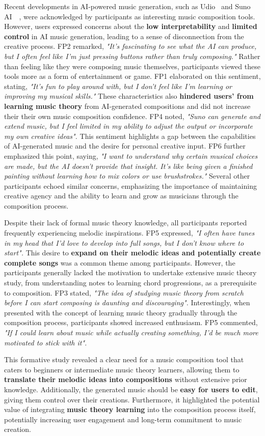 Recent developments in AI-powered music generation, such as Udio~\cite{r8} and Suno AI~\cite{r7}~\cite{r6}, were acknowledged by participants as interesting music composition tools. However, users expressed concerns about the \textbf{low interpretability} and \textbf{limited control} in AI music generation, leading to a sense of disconnection from the creative process. FP2 remarked, \textit{"It's fascinating to see what the AI can produce, but I often feel like I'm just pressing buttons rather than truly composing."} Rather than feeling like they were composing music themselves, participants viewed these tools more as a form of entertainment or game. FP1 elaborated on this sentiment, stating, \textit{"It's fun to play around with, but I don't feel like I'm learning or improving my musical skills."} These characteristics also \textbf{hindered users' from learning music theory} from AI-generated compositions and did not increase their their own music composition confidence. FP4 noted, \textit{"Suno can generate and extend music, but I feel limited in my ability to adjust the output or incorporate my own creative ideas".} This sentiment highlights a gap between the capabilities of AI-generated music and the desire for personal creative input. FP6 further emphasized this point, saying, \textit{"I want to understand why certain musical choices are made, but the AI doesn't provide that insight. It's like being given a finished painting without learning how to mix colors or use brushstrokes."} Several other participants echoed similar concerns, emphasizing the importance of maintaining creative agency and the ability to learn and grow as musicians through the composition process.

Despite their lack of formal music theory knowledge, all participants reported frequently experiencing melodic inspirations. FP5 expressed, \textit{"I often have tunes in my head that I'd love to develop into full songs, but I don't know where to start".} This desire to \textbf{expand on their melodic ideas and potentially create complete songs} was a common theme among participants. However, the participants generally lacked the motivation to undertake extensive music theory study, from understanding notes to learning chord progressions, as a prerequisite to composition. FP3 stated, \textit{"The idea of studying music theory from scratch before I can start composing is daunting and discouraging".} Interestingly, when presented with the concept of learning music theory gradually through the composition process, participants showed increased enthusiasm. FP5 commented, \textit{"If I could learn about music while actually creating something, I'd be much more motivated to stick with it".}

This formative study revealed a clear need for a music composition tool that caters to beginners or intermediate music theory learners, allowing them to \textbf{translate their melodic ideas into compositions} without extensive prior knowledge. Additionally, the generated music should be \textbf{easy for users to edit}, giving them control over their creations. Furthermore, it highlighted the potential value of integrating \textbf{music theory learning} into the composition process itself, potentially increasing user engagement and long-term commitment to music creation.